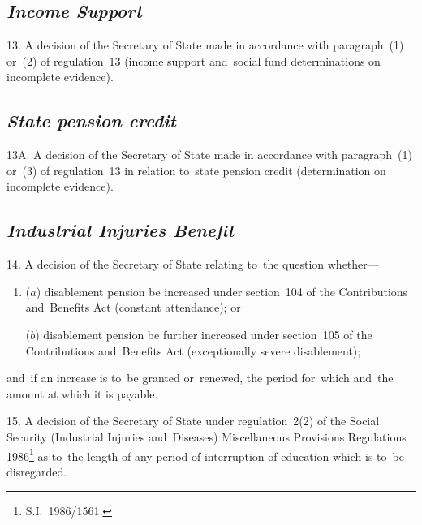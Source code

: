 \documentclass[12pt,a4paper]{article}
\begin{document}
\subsection*{\itshape Income Support}

13.  A decision of the Secretary of State 
made in accordance with paragraph~(1) or~(2) of regulation~13 (income support and~social fund determinations on incomplete evidence).


\subsection*{\itshape State pension credit}

13A.  A decision of the Secretary of State made in accordance with paragraph~(1) or~(3) of regulation~13 in relation to~state pension credit (determination on incomplete evidence).


\subsection*{\itshape Industrial Injuries Benefit}

14.  A decision of the Secretary of State relating to~the question whether—
\begin{enumerate}\item[]
($a$) disablement pension be increased under section~104 of the Contributions and~Benefits Act (constant attendance); or

($b$) disablement pension be further increased under section~105 of the Contributions and~Benefits Act (exceptionally severe disablement);
\end{enumerate}
and~if an increase is to~be granted or~renewed, the period for~which and~the amount at which it is payable.

\medskip

15.  A decision of the Secretary of State under regulation~2(2) of the Social Security (Industrial Injuries and~Diseases) Miscellaneous Provisions Regulations 1986\footnote{\frenchspacing S.I.~1986/1561.} as to~the length of any period of interruption of education which is to~be disregarded.
\end{document}
